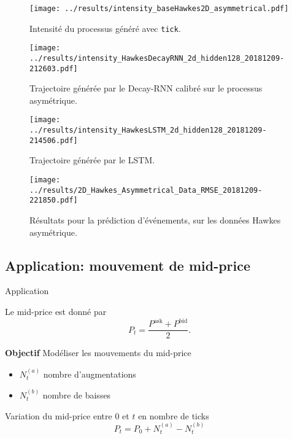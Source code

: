 \documentclass[../main.tex]{subfiles}
\begin{document}
\begin{frame}
\begin{figure}
	\texttt{[image: ../results/intensity\_baseHawkes2D\_asymmetrical.pdf]}
	\caption{Intensité du processus généré avec \texttt{tick}.}
\end{figure}
\end{frame}

\begin{frame}
\begin{figure}
	\texttt{[image: ../results/intensity\_HawkesDecayRNN\_2d\_hidden128\_20181209-212603.pdf]}
	\caption{Trajectoire générée par le Decay-RNN calibré sur le processus asymétrique.}	
\end{figure}
\end{frame}

\begin{frame}
\begin{figure}
	\texttt{[image: ../results/intensity\_HawkesLSTM\_2d\_hidden128\_20181209-214506.pdf]}
	\caption{Trajectoire générée par le LSTM.}
\end{figure}
\end{frame}

\begin{frame}
\begin{figure}
	\texttt{[image: ../results/2D\_Hawkes\_Asymmetrical\_Data\_RMSE\_20181209-221850.pdf]}
	\caption{Résultats pour la prédiction d'événements, sur les données Hawkes asymétrique.}
\end{figure}
\end{frame}

\subsection{Application: mouvement de mid-price}

\begin{frame}{Application}

Le mid-price est donné par
\begin{equation*}
	P_t = \frac{P^\text{ask} + P^\text{bid}}{2}.
\end{equation*}

\textbf{Objectif} Modéliser les mouvements du mid-price

\begin{itemize}
	\item $N_t^{(a)}$ nombre d'augmentations
	\item $N_t^{(b)}$ nombre de baisses
\end{itemize}

Variation du mid-price entre $0$ et $t$ en nombre de ticks \autocite{2015arXiv150204592B}
\begin{equation}
	P_t = P_0 + N_t^{(a)} - N_t^{(b)}
\end{equation}

\end{frame}
\end{document}

